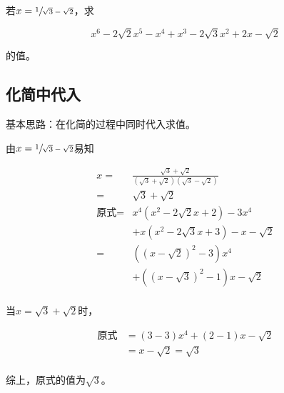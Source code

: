 

若$x = \sfrac1{\sqrt3 - \sqrt2}$，求

\[ x^6 - 2\sqrt2x^5 - x^4 + x^3 - 2\sqrt3x^2 + 2x - \sqrt2 \]

的值。


\subsection{化简中代入}

基本思路：在化简的过程中同时代入求值。

由$x = \sfrac1{\sqrt3 - \sqrt2}$易知

\begin{align*}
  x ={}& \frac{\sqrt3 + \sqrt2}{(\sqrt3 + \sqrt2)(\sqrt3 - \sqrt2)} \\
  ={}& \sqrt3 + \sqrt2 \\
  \text{原式} ={}& x^4\left(x^2 - 2\sqrt2x + 2\right) - 3x^4 \\
  &+ x\left(x^2 - 2\sqrt3x + 3\right) - x - \sqrt2 \\
  ={}& \left(\left(x - \sqrt2\right)^2 - 3\right)x^4 \\
  &+ \left(\left(x - \sqrt3\right)^2 - 1\right)x - \sqrt2 \\
\end{align*}

当$x = \sqrt3 + \sqrt2$时，

\begin{align*}
  \text{原式} &= (3 - 3)x^4 + (2 - 1)x - \sqrt2 \\
  &= x - \sqrt2 = \sqrt3 \\
\end{align*}

综上，原式的值为$\sqrt3$。
